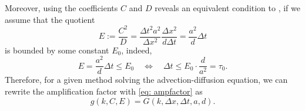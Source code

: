 Moreover, using the coefficients $C$ and $D$ reveals an equivalent condition to \cite{TanChenShu_ImEx_Stability}, if we assume that the quotient
\begin{equation*}
E:=\frac{C^2}{D}= \frac{ \Delta t ^2 a^2 }{\Delta x^2} \frac{\Delta x^2}{d \Delta t} = \frac{a^2}{d}\Delta t
\end{equation*}
is bounded by some constant $E_0$, indeed,
\begin{equation*}
E= \frac{a^2}{d}\Delta t\le E_0 \quad \Longleftrightarrow \quad \Delta t \le E_0 \cdot \frac{d}{a^2}=\tau_0.
\end{equation*}
Therefore, for a given method solving the advection-diffusion equation, we can rewrite the amplification factor  with \eqref{eq: ampfactor} as
\begin{equation}
	g(k,C,E)=G(k,\Delta x, \Delta t, a,d).
\end{equation}

